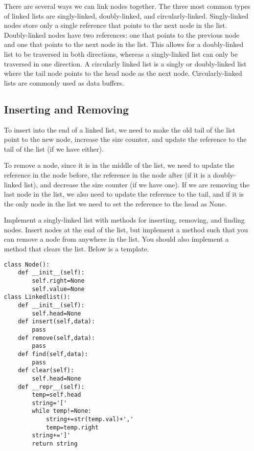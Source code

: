 There are several ways we can link nodes together.  The three most common types of linked lists are singly-linked, doubly-linked, and circularly-linked.
Singly-linked nodes store only a single reference that points to the next node in the list.
Doubly-linked nodes have two references:
one that points to the previous node and one that points to the next node in the list.
This allows for a doubly-linked list to be traversed in both directions, whereas a singly-linked list can only be traversed in one direction.
A circularly linked list is a singly or doubly-linked list where the tail node points to the head node as the next node.
Circularly-linked lists are commonly used as data buffers.

\subsection*{Inserting and Removing}

To insert into the end of a linked list, we need to make the old tail of the list point to the new node, increase the size counter, and update the reference to the tail of the list (if we have either).

To remove a node, since it is in the middle of the list, we need to update the reference in the node before, the reference in the node after (if it is a doubly-linked list), and decrease the size counter (if we have one).
If we are removing the last node in the list, we also need to update the reference to the tail, and if it is the only node in the list we need to set the reference to the head as None.


\begin{problem}
Implement a singly-linked list with methods for inserting, removing, and finding nodes. Insert nodes at the end of the list, but implement a method such that you can remove a node from anywhere in the list. You should also implement a method that clears the list. Below is a template.
\begin{lstlisting}
class Node():
    def __init__(self):
        self.right=None
        self.value=None
class Linkedlist():
    def __init__(self):
        self.head=None
    def insert(self,data):
        pass
    def remove(self,data):
        pass
    def find(self,data):
        pass
    def clear(self):
        self.head=None
    def __repr__(self):
        temp=self.head
        string='['
        while temp!=None:
            string+=str(temp.val)+','
            temp=temp.right
        string+=']'
        return string
\end{lstlisting}
\end{problem}

